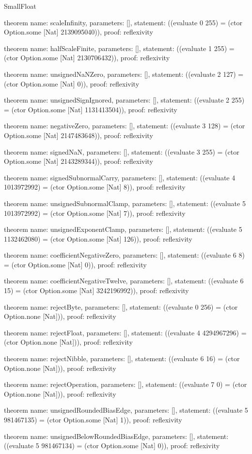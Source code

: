 \begin{lexlean}{SmallFloat}
\begin{semanticmodule}
theorem{
  name: scaleInfinity,
  parameters: [],
  statement: ((evaluate 0 255) = (ctor Option.some [Nat] 2139095040)),
  proof: reflexivity{}
}

theorem{
  name: halfScaleFinite,
  parameters: [],
  statement: ((evaluate 1 255) = (ctor Option.some [Nat] 2130706432)),
  proof: reflexivity{}
}

theorem{
  name: unsignedNaNZero,
  parameters: [],
  statement: ((evaluate 2 127) = (ctor Option.some [Nat] 0)),
  proof: reflexivity{}
}

theorem{
  name: unsignedSignIgnored,
  parameters: [],
  statement: ((evaluate 2 255) = (ctor Option.some [Nat] 1131413504)),
  proof: reflexivity{}
}

theorem{
  name: negativeZero,
  parameters: [],
  statement: ((evaluate 3 128) = (ctor Option.some [Nat] 2147483648)),
  proof: reflexivity{}
}

theorem{
  name: signedNaN,
  parameters: [],
  statement: ((evaluate 3 255) = (ctor Option.some [Nat] 2143289344)),
  proof: reflexivity{}
}

theorem{
  name: signedSubnormalCarry,
  parameters: [],
  statement: ((evaluate 4 1013972992) = (ctor Option.some [Nat] 8)),
  proof: reflexivity{}
}

theorem{
  name: unsignedSubnormalClamp,
  parameters: [],
  statement: ((evaluate 5 1013972992) = (ctor Option.some [Nat] 7)),
  proof: reflexivity{}
}

theorem{
  name: unsignedExponentClamp,
  parameters: [],
  statement: ((evaluate 5 1132462080) = (ctor Option.some [Nat] 126)),
  proof: reflexivity{}
}

theorem{
  name: coefficientNegativeZero,
  parameters: [],
  statement: ((evaluate 6 8) = (ctor Option.some [Nat] 0)),
  proof: reflexivity{}
}

theorem{
  name: coefficientNegativeTwelve,
  parameters: [],
  statement: ((evaluate 6 15) = (ctor Option.some [Nat] 3242196992)),
  proof: reflexivity{}
}

theorem{
  name: rejectByte,
  parameters: [],
  statement: ((evaluate 0 256) = (ctor Option.none [Nat])),
  proof: reflexivity{}
}

theorem{
  name: rejectFloat,
  parameters: [],
  statement: ((evaluate 4 4294967296) = (ctor Option.none [Nat])),
  proof: reflexivity{}
}

theorem{
  name: rejectNibble,
  parameters: [],
  statement: ((evaluate 6 16) = (ctor Option.none [Nat])),
  proof: reflexivity{}
}

theorem{
  name: rejectOperation,
  parameters: [],
  statement: ((evaluate 7 0) = (ctor Option.none [Nat])),
  proof: reflexivity{}
}

theorem{
  name: unsignedRoundedBiasEdge,
  parameters: [],
  statement: ((evaluate 5 981467135) = (ctor Option.some [Nat] 1)),
  proof: reflexivity{}
}

theorem{
  name: unsignedBelowRoundedBiasEdge,
  parameters: [],
  statement: ((evaluate 5 981467134) = (ctor Option.some [Nat] 0)),
  proof: reflexivity{}
}
\end{semanticmodule}
\end{lexlean}

